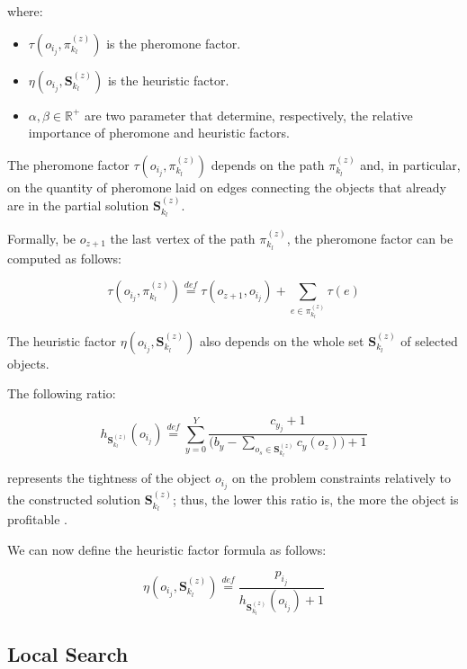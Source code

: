 \documentclass[12pt,a4paper]{report}
\newcommand{\mathDef}{\overset{\textit{def}}{=}}
\newcommand{\Rplus}{\mathbb{R}^+}
\begin{document}
where:

\begin{itemize}
	\item $\tau( o_{i_j}, \pi_{k_l}^{(z)})$ is the pheromone factor.
	\item $\eta( o_{i_j}, \textbf{S}_{k_l}^{(z)})$ is the heuristic factor.
	\item $\alpha, \beta \in \Rplus$ are two parameter that determine, respectively, the relative importance of pheromone and heuristic factors.
\end{itemize}

The pheromone factor $\tau( o_{i_j}, \pi_{k_l}^{(z)})$ depends on the path $\pi_{k_l}^{(z)}$ and, in particular, on the quantity of pheromone laid on edges connecting the objects that already are in the partial solution $\textbf{S}_{k_l}^{(z)}$.

Formally, be $o_{z+1}$ the last vertex of the path $\pi_{k_l}^{(z)}$, the pheromone factor can be computed as follows:

\begin{equation}
	\tau( o_{i_j}, \pi_{k_l}^{(z)}) \mathDef \tau(o_{z+1}, o_{i_j}) + \sum_{e \in \pi_{k_l}^{(z)}} \tau(e) 
\end{equation}

The heuristic factor $\eta( o_{i_j}, \textbf{S}_{k_l}^{(z)})$ also depends on the whole set $\textbf{S}_{k_l}^{(z)}$ of selected objects. 



The following ratio:

\begin{equation}
	h_{\textbf{S}_{k_l}^{(z)}}(o_{i_j}) \mathDef \displaystyle \sum_{y=0}^{Y} \frac{c_{y_j} + 1}{\displaystyle  \Big( b_y - \sum_{o_s \in \textbf{S}_{k_l}^{(z)}} c_y(o_z)\Big) + 1}
\end{equation}

represents the tightness of the object $o_{i_j}$ on the problem constraints relatively to the constructed solution $\textbf{S}_{k_l}^{(z)}$; thus, the lower this ratio is, the more the object is profitable \cite{acosemplice}.

We can now define the heuristic factor formula as follows:

\begin{equation}
	\eta( o_{i_j}, \textbf{S}_{k_l}^{(z)}) \mathDef \frac{p_{i_j}}{h_{\textbf{S}_{k_l}^{(z)}}(o_{i_j}) + 1}
\end{equation}

\subsection{Local Search}
\end{document}

